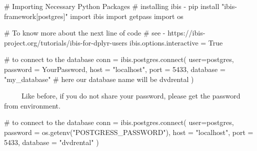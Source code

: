 \documentclass[
  letterpaper,
  DIV=11,
  numbers=noendperiod]{scrreprt}
\newenvironment{Shaded}{\begin{snugshade}}{\end{snugshade}}
\newcommand{\CommentTok}[1]{\textcolor[rgb]{0.37,0.37,0.37}{#1}}
\newcommand{\DecValTok}[1]{\textcolor[rgb]{0.68,0.00,0.00}{#1}}
\newcommand{\ExtensionTok}[1]{\textcolor[rgb]{0.00,0.23,0.31}{#1}}
\newcommand{\ImportTok}[1]{\textcolor[rgb]{0.00,0.46,0.62}{#1}}
\newcommand{\NormalTok}[1]{\textcolor[rgb]{0.00,0.23,0.31}{#1}}
\newcommand{\OperatorTok}[1]{\textcolor[rgb]{0.37,0.37,0.37}{#1}}
\newcommand{\StringTok}[1]{\textcolor[rgb]{0.13,0.47,0.30}{#1}}
\newcommand{\VariableTok}[1]{\textcolor[rgb]{0.07,0.07,0.07}{#1}}
\begin{document}
\begin{Shaded}
\begin{Highlighting}[]
\CommentTok{\# Importing Necessary Python Packages }
\CommentTok{\# installing ibis {-} pip install "ibis{-}framework[postgres]"}
\ImportTok{import}\NormalTok{ ibis}
\ImportTok{import}\NormalTok{ getpass}
\ImportTok{import}\NormalTok{ os }
\end{Highlighting}
\end{Shaded}

\begin{Shaded}
\begin{Highlighting}[]
\CommentTok{\# To know more about the next line of code}
\CommentTok{\# see {-} https://ibis{-}project.org/tutorials/ibis{-}for{-}dplyr{-}users}
\NormalTok{ibis.options.interactive }\OperatorTok{=} \VariableTok{True}
\end{Highlighting}
\end{Shaded}

\begin{Shaded}
\begin{Highlighting}[]
\CommentTok{\# to connect to the database }
\NormalTok{conn }\OperatorTok{=}\NormalTok{ ibis.postgres.}\ExtensionTok{connect}\NormalTok{(}
\NormalTok{    user}\OperatorTok{=}\StringTok{\textquotesingle{}postgres\textquotesingle{}}\NormalTok{, }
\NormalTok{    password }\OperatorTok{=} \StringTok{\textquotesingle{}YourPassword\textquotesingle{}}\NormalTok{,}
\NormalTok{    host }\OperatorTok{=} \StringTok{"localhost"}\NormalTok{,}
\NormalTok{    port }\OperatorTok{=} \DecValTok{5433}\NormalTok{,}
\NormalTok{    database }\OperatorTok{=} \StringTok{"my\_database"} \CommentTok{\# here our database name will be \textquotesingle{}dvdrental\textquotesingle{}}
\NormalTok{)}
\end{Highlighting}
\end{Shaded}

~~~~~Like before, if you do not share your password, please get the
password from environment.

\begin{Shaded}
\begin{Highlighting}[]
\CommentTok{\# to connect to the database }
\NormalTok{conn }\OperatorTok{=}\NormalTok{ ibis.postgres.}\ExtensionTok{connect}\NormalTok{(}
\NormalTok{    user}\OperatorTok{=}\StringTok{\textquotesingle{}postgres\textquotesingle{}}\NormalTok{, }
\NormalTok{    password }\OperatorTok{=}\NormalTok{ os.getenv(}\StringTok{"POSTGRESS\_PASSWORD"}\NormalTok{),}
\NormalTok{    host }\OperatorTok{=} \StringTok{"localhost"}\NormalTok{,}
\NormalTok{    port }\OperatorTok{=} \DecValTok{5433}\NormalTok{,}
\NormalTok{    database }\OperatorTok{=} \StringTok{"dvdrental"}
\NormalTok{)}
\end{Highlighting}
\end{Shaded}
\end{document}
